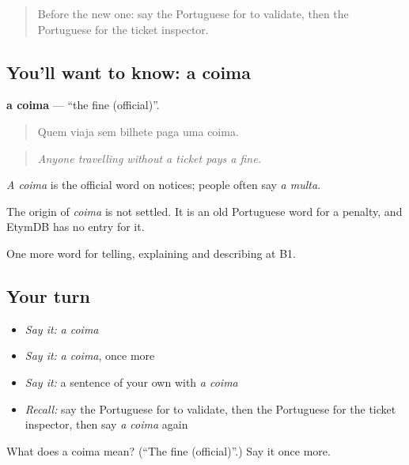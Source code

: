 \label{lesson:PT-C414-coima}



\begin{quote}
Before the new one: say the Portuguese for to validate, then the Portuguese for the ticket inspector.
\end{quote}

\subsection*{You'll want to know: a coima}
\textbf{a coima} — \textquotedblleft{}the fine (official)\textquotedblright{}.

\begin{quote}
Quem viaja sem bilhete paga uma coima.
\end{quote}

\begin{quote}
\emph{Anyone travelling without a ticket pays a fine.}
\end{quote}

\emph{A coima} is the official word on notices; people often say \emph{a multa}.

\begin{cousinweb}
The origin of \emph{coima} is not settled. It is an old Portuguese word for a penalty, and EtymDB has no entry for it.
\end{cousinweb}

\begin{grammarlens}[title={What you've built}]
One more word for telling, explaining and describing at B1.
\end{grammarlens}

\subsection*{Your turn}
\begin{itemize}
\raggedright
  \item \emph{Say it:} \emph{a coima}
  \item \emph{Say it:} \emph{a coima}, once more
  \item \emph{Say it:} a sentence of your own with \emph{a coima}
  \item \emph{Recall:} say the Portuguese for to validate, then the Portuguese for the ticket inspector, then say \emph{a coima} again
\end{itemize}

\begin{tcolorbox}[breakable,colback=teal!4,colframe=teal!35!black,title={Before you move on}]
What does a coima mean? (\textquotedblleft{}The fine (official)\textquotedblright{}.) Say it once more.
\end{tcolorbox}
